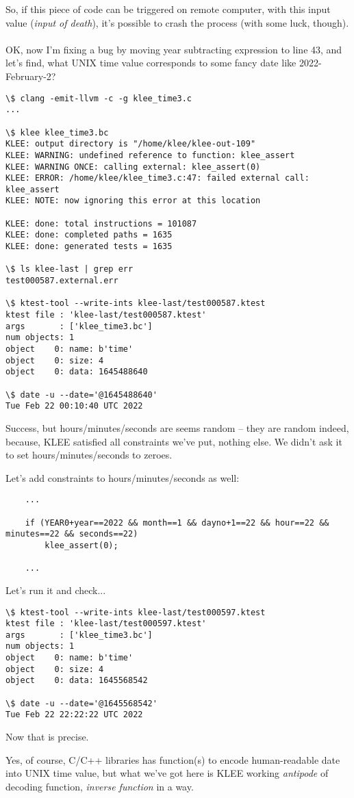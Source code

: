 So, if this piece of code can be triggered on remote computer, with this input value (\textit{input of death}),
it's possible to crash the process (with some luck, though).\\
\\
OK, now I'm fixing a bug by moving year subtracting expression to line 43, and let's find, what UNIX time value corresponds to some fancy date
like 2022-February-2?



\begin{lstlisting}
\$ clang -emit-llvm -c -g klee_time3.c
...

\$ klee klee_time3.bc
KLEE: output directory is "/home/klee/klee-out-109"
KLEE: WARNING: undefined reference to function: klee_assert
KLEE: WARNING ONCE: calling external: klee_assert(0)
KLEE: ERROR: /home/klee/klee_time3.c:47: failed external call: klee_assert
KLEE: NOTE: now ignoring this error at this location

KLEE: done: total instructions = 101087
KLEE: done: completed paths = 1635
KLEE: done: generated tests = 1635

\$ ls klee-last | grep err
test000587.external.err

\$ ktest-tool --write-ints klee-last/test000587.ktest
ktest file : 'klee-last/test000587.ktest'
args       : ['klee_time3.bc']
num objects: 1
object    0: name: b'time'
object    0: size: 4
object    0: data: 1645488640

\$ date -u --date='@1645488640'
Tue Feb 22 00:10:40 UTC 2022
\end{lstlisting}

Success, but hours/minutes/seconds are seems random -- they are random indeed, because, KLEE satisfied all constraints we've put, nothing else.
We didn't ask it to set hours/minutes/seconds to zeroes.

Let's add constraints to hours/minutes/seconds as well:

\begin{lstlisting}
	...

	if (YEAR0+year==2022 && month==1 && dayno+1==22 && hour==22 && minutes==22 && seconds==22)
		klee_assert(0);
	
	...
\end{lstlisting}

Let's run it and check...

\begin{lstlisting}
\$ ktest-tool --write-ints klee-last/test000597.ktest
ktest file : 'klee-last/test000597.ktest'
args       : ['klee_time3.bc']
num objects: 1
object    0: name: b'time'
object    0: size: 4
object    0: data: 1645568542

\$ date -u --date='@1645568542'
Tue Feb 22 22:22:22 UTC 2022
\end{lstlisting}

Now that is precise.

Yes, of course, C/C++ libraries has function(s) to encode human-readable date into UNIX time value, but what we've got here is KLEE working
\textit{antipode} of decoding function, \textit{inverse function} in a way.

